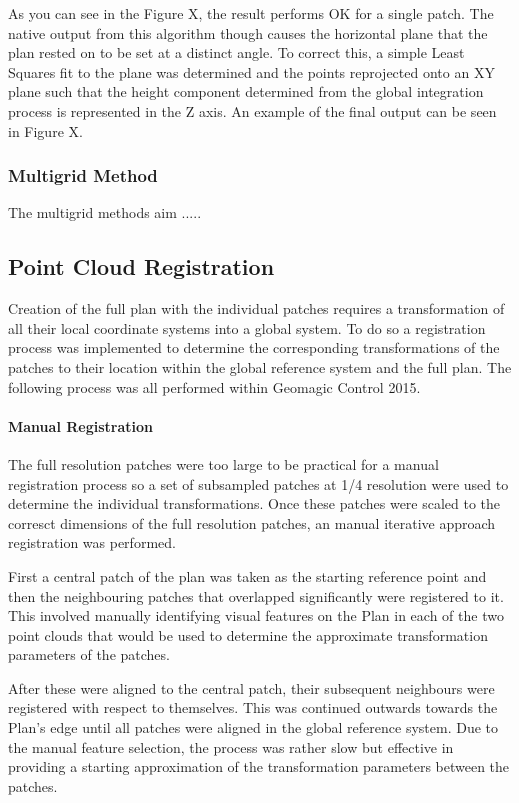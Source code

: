 As you can see in the Figure X, the result performs OK for a single patch. The native output from this algorithm though causes the horizontal plane that the plan rested on to be set at a distinct angle. To correct this, a simple Least Squares fit to the plane was determined and the points reprojected onto an XY plane such that the height component determined from the global integration process is represented in the Z axis. An example of the final output can be seen in Figure X.

\subsubsection{Multigrid Method}
\label{sec:MultigridMethod}
The multigrid methods aim .....

\subsection{Point Cloud Registration}
\label{sec:PointCloudRegistration}
Creation of the full plan with the individual patches requires a transformation of all their local coordinate systems into a global system. To do so a registration process was implemented to determine the corresponding transformations of the patches to their location within the global reference system and the full plan. The following process was all performed within Geomagic Control 2015.

\paragraph{Manual Registration}
The full resolution patches were too large to be practical for a manual registration process so a set of subsampled patches at 1/4 resolution were used to determine the individual transformations. Once these patches were scaled to the corresct dimensions of the full resolution patches, an manual iterative approach registration was performed.

First a central patch of the plan was taken as the starting reference point and then the neighbouring patches that overlapped significantly were registered to it. This involved manually identifying visual features on the Plan in each of the two point clouds that would be used to determine the approximate transformation parameters of the patches.

After these were aligned to the central patch, their subsequent neighbours were registered with respect to themselves. This was continued outwards towards the Plan's edge until all patches were aligned in the global reference system. Due to the manual feature selection, the process was rather slow but effective in providing a starting approximation of the transformation parameters between the patches.

